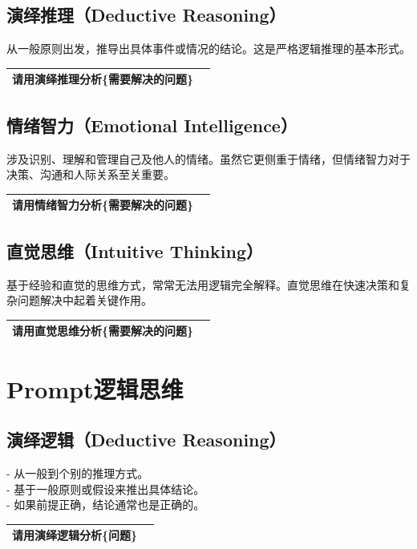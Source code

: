 \documentclass[12pt]{book}
\begin{document}
\subsection{演绎推理（Deductive Reasoning）}
\bigskip
  从一般原则出发，推导出具体事件或情况的结论。这是严格逻辑推理的基本形式。

\begin{tabular}{|p{15cm}|p{3cm}|}
	\hline
请用演绎推理分析\{需要解决的问题\}\\
	\hline
\end{tabular}


\subsection{情绪智力（Emotional Intelligence）}
\bigskip
  涉及识别、理解和管理自己及他人的情绪。虽然它更侧重于情绪，但情绪智力对于决策、沟通和人际关系至关重要。

\begin{tabular}{|p{15cm}|p{3cm}|}
	\hline
请用情绪智力分析\{需要解决的问题\}\\
	\hline
\end{tabular}


\subsection{直觉思维（Intuitive Thinking）}
\bigskip
  基于经验和直觉的思维方式，常常无法用逻辑完全解释。直觉思维在快速决策和复杂问题解决中起着关键作用。

\begin{tabular}{|p{15cm}|p{3cm}|}
	\hline
请用直觉思维分析\{需要解决的问题\}\\
	\hline
\end{tabular}



\section{Prompt逻辑思维}
\subsection{演绎逻辑（Deductive Reasoning）}
\bigskip
- 从一般到个别的推理方式。\\
- 基于一般原则或假设来推出具体结论。\\
- 如果前提正确，结论通常也是正确的。\\

\begin{tabular}{|p{15cm}|p{3cm}|}
	\hline
请用演绎逻辑分析\{问题\}\\
	\hline
\end{tabular}
\end{document}
